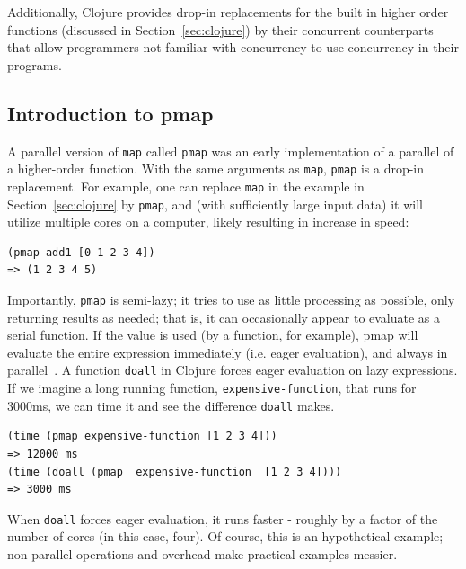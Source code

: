 \documentclass[12pt]{article}
\newcommand{\comment}[1]{{\bf \tt  {#1}}}
\newcommand{\emcomment}[1]{\textcolor{ForestGreen}{\comment{Elena: {#1}}}}
\newcommand{\hfcomment}[1]{\textcolor{Teal}{\comment{Henry: {#1}}}}
\newcommand{\clocode}[1]{{\texttt {#1}}}
\begin{document}
Additionally, Clojure provides drop-in replacements for the built in higher order functions (discussed in Section~\ref{sec:clojure}) by their concurrent counterparts that allow programmers not familiar with concurrency to use concurrency in their programs.


\subsection{Introduction to pmap}\label{sec:pmap}
A parallel version of \clocode{map} called \clocode{pmap} was an early implementation of a parallel of a higher-order function. With the same arguments as \clocode{map}, \clocode{pmap} is a drop-in replacement. For example, one can replace \clocode{map} in the example in Section~\ref{sec:clojure} by \clocode{pmap}, and (with sufficiently large input data) it will utilize multiple cores on a computer, likely resulting in increase in speed:   
\begin{verbatim}
(pmap add1 [0 1 2 3 4])
=> (1 2 3 4 5)
\end{verbatim}
Importantly, \clocode{pmap} is semi-lazy; it tries to use as little processing as possible, only returning results as needed; that is, it can occasionally appear to evaluate as a serial function. %
If the value is used (by a function, for example), pmap will evaluate the entire expression immediately (i.e. eager evaluation), and always %
 in parallel~\cite{Pmap}. A function \clocode{doall} in Clojure forces eager evaluation on lazy expressions. 
If we imagine a long running function, \clocode{expensive-function}, that runs for 3000ms, we can time it and see the difference \clocode{doall} makes.
\begin{verbatim}
(time (pmap expensive-function [1 2 3 4]))
=> 12000 ms 
(time (doall (pmap  expensive-function  [1 2 3 4])))
=> 3000 ms
\end{verbatim}
When \clocode{doall} forces eager evaluation, it runs faster - roughly by a factor of the number of cores (in this case, four). Of course, this is an hypothetical example; non-parallel operations and overhead make practical examples messier.
\end{document}
